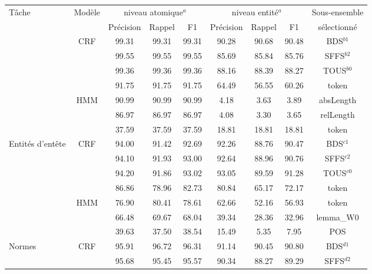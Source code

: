 \begin{table}[!htb]
\scriptsize
\begin{center}
\begin{tabular}{p{1cm}|c|ccc|ccc|c}
\hline\noalign{\smallskip}
Tâche & Modèle & \multicolumn{3}{c}{niveau atomique$^a$} & \multicolumn{3}{c}{niveau entité$^a$}& Sous-ensemble \\
 & & Précision & Rappel & F1 &  Précision & Rappel & F1 & sélectionné\\
\noalign{\smallskip}\hline\noalign{\smallskip}
\multirow{7}{*}{Sections} 		& \multirow{4}{*}{CRF} & 99.31 & 99.31 & 99.31 & 90.28 & 90.68 & 90.48 & BDS$^{b1}$  \\
  				&  & 99.55 & 99.55 & {99.55} & 85.69 & 85.84 & 85.76 & {SFFS}$^{b2}$ \\
                &  & 99.36 & 99.36 & 99.36 & 88.16 & 88.39 & 88.27 & TOUS$^{b0}$ \\
                &  & 91.75 & 91.75 & 91.75 & 64.49 & 56.55 & 60.26 & token \\  \cline{2-9}
                 & \multirow{3}{*}{HMM} & 90.99 & 90.99 & {90.99}  & 4.18 & 3.63 & 3.89 & {absLength} \\ 
 & & 86.97 & 86.97 & 86.97 & 4.08 & 3.30 & 3.65 & relLength \\   
  &  & 37.59 & 37.59 & 37.59  & 18.81 & 18.81 & 18.81 & token \\ \hline
\multirow{7}{=}{Entités d'entête}	& \multirow{4}{*}{CRF} & 94.00 & 91.42 & 92.69 & 92.26 & 88.76 & 90.47 & BDS$^{c1}$  \\
				&  & 94.10 & 91.93 & {93.00} & 92.64 & 88.96 & 90.76 & {SFFS}$^{c2}$  \\ 
                &  & 94.20 & 91.86 & 93.02 & 93.05 & 89.59 & 91.28 & TOUS$^{c0}$ \\
                &  & 86.86 & 78.96 & 82.73 & 80.84 & 65.17 & 72.17 & token \\ \cline{2-9}
                  &  \multirow{3}{*}{HMM}  & 76.90 & 80.41 & {78.61} & 62.66 & 52.16 & 56.93 &  {token} \\ 
  &    & 66.48 & 69.67 & 68.04 & 39.34 & 28.36 & 32.96 &  lemma\_W0 \\ 
  &    & 39.63 & 37.50 & 38.54 & 15.49 & 5.35 & 7.95 &  POS \\ \hline
\multirow{6}{*}{Normes} 			& \multirow{4}{*}{CRF} & 95.91 & 96.72 & 96.31 & 91.14 & 90.45 & 90.80 & {BDS}$^{d1}$ \\ 
				&  & 95.68 & 95.45 & 95.57 & 90.34 & 88.27 & 89.29 & SFFS$^{d2}$ \\ 

\end{tabular}
\end{center}
\end{table}
